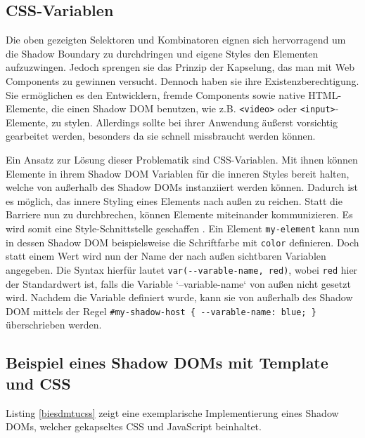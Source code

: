 \subsection{CSS-Variablen}\label{css-variablen}

Die oben gezeigten Selektoren und Kombinatoren eignen sich hervorragend um die Shadow Boundary zu durchdringen und eigene Styles den Elementen aufzuzwingen. Jedoch sprengen sie das Prinzip der Kapselung, das man mit Web Components zu gewinnen versucht. Dennoch haben sie ihre Existenzberechtigung. Sie ermöglichen es den Entwicklern, fremde Components sowie native \ac{HTML}-Elemente, die einen Shadow \ac{DOM} benutzen, wie z.B. \texttt{\textless{}video\textgreater{}} oder \texttt{\textless{}input\textgreater{}}-Elemente, zu stylen. Allerdings sollte bei ihrer Anwendung äußerst vorsichtig gearbeitet werden, besonders da sie schnell missbraucht werden können.

Ein Ansatz zur Lösung dieser Problematik sind \ac{CSS}-Variablen. Mit ihnen können Elemente in ihrem Shadow \ac{DOM} Variablen für die inneren Styles bereit halten, welche von außerhalb des Shadow \ac{DOM}s instanziiert werden können. Dadurch ist es möglich, das innere Styling eines Elements nach außen zu reichen. Statt die Barriere nun zu durchbrechen, können Elemente miteinander kommunizieren. Es wird somit eine Style-Schnittstelle geschaffen \cite{citeulike:13883381}. Ein Element \texttt{my-element} kann nun in dessen Shadow \ac{DOM} beispielsweise die Schriftfarbe mit \texttt{color} definieren. Doch statt einem Wert wird nun der Name der nach außen sichtbaren Variablen angegeben. Die Syntax hierfür lautet \texttt{var(-\/-varable-name,\ red)}, wobei \texttt{red} hier der Standardwert ist, falls die Variable `--variable-name` von außen nicht gesetzt wird. Nachdem die Variable definiert wurde, kann sie von außerhalb des Shadow \ac{DOM} mittels der Regel \texttt{\#my-shadow-host\ \{\ -\/-varable-name:\ blue;\ \}} überschrieben werden.

\subsection{Beispiel eines Shadow DOMs mit Template und CSS}\label{beispiel-eines-shadow-doms-mit-template-und-css}

Listing \ref{biesdmtucss} zeigt eine exemplarische Implementierung eines Shadow \ac{DOM}s, welcher gekapseltes \ac{CSS} und JavaScript beinhaltet.



